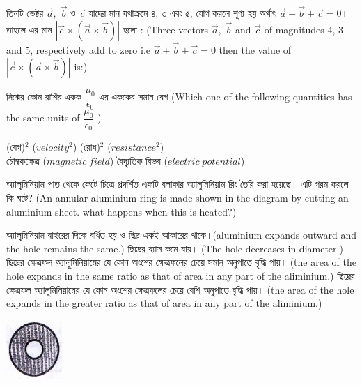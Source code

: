 \documentclass[addpoints]{exam}
\begin{document}
\begin{questions}
\question  তিনটি ভেক্টর $ \vec{a},\; \vec{b} $ ও $ \vec{c} $ যাদের মান যথাক্রমে ৪, ৩  এবং ৫, যোগ করলে শূণ্য হয় অর্থাৎ $ \vec{a}+\vec{b}+\vec{c} =0  $। তাহলে এর মান $ |\vec{c}\times (\vec{a}\times \vec{b})| $ হলো : (Three vectors $ \vec{a},\; \vec{b} $ and $ \vec{c} $ of magnitudes 4, 3 and 5, respectively add to zero i.e $ \vec{a}+\vec{b}+\vec{c} =0  $ then the value of $ |\vec{c}\times (\vec{a}\times \vec{b})| $ is:)

\begin{oneparchoices}
\end{oneparchoices}

\question  নিন্মের কোন রাশির একক $ \dfrac{\mu_{0}}{\epsilon_{0}} $ এর এককের সমান বেগ (Which one of the following quantities has the same units of $ \dfrac{\mu_{0}}{\epsilon_{0}} $ )

\begin{oneparchoices}
\choice (বেগ)$ ^{2} $ ($ velocity^{2} $)
\hspace*{1.4cm}\choice  (রোধ)$ ^{2} $ ($ resistance^{2} $)\\
\hspace*{-.32cm}\choice  চৌম্বকক্ষেত্র ($ magnetic\; field $)
\choice  বৈদ্যুতিক বিভব ($ electric\; potential $)
\end{oneparchoices}

\question   অ্যালুমিনিয়াম পাত থেকে কেটে চিত্রে প্রদর্শিত একটি বলাকার অ্যালুমিনিয়াম রিং তৈরি করা হয়েছে। এটি গরম করলে কি ঘটে? (An annular aluminium ring is made shown in the diagram by cutting an aluminium sheet. what happens when this is heated?)

\begin{minipage}{0.6\textwidth}\raggedright
\begin{oneparchoices}
\choice অ্যালুমিনিয়াম বাইরের দিকে বর্ধিত হয় ও ছিদ্র একই আকারের থাকে।(aluminium expands outward and the hole remains the same.)
\choice  ছিদ্রের ব্যাস কমে যায়। (The hole decreases in diameter.)
\choice  ছিদ্রের ক্ষেত্রফল অ্যালুমিনিয়ামের যে কোন অংশের ক্ষেত্রফলের চেয়ে সমান অনুপাতে বৃদ্ধি পায়। (the area of the hole expands in the same ratio as that of area in any part of the aliminium.)
\choice ছিদ্রের ক্ষেত্রফল অ্যালুমিনিয়ামের যে কোন অংশের ক্ষেত্রফলের চেয়ে বেশি অনুপাতে বৃদ্ধি পায়। (the area of the hole expands in the greater ratio as that of area in any part of the aliminium.)
\end{oneparchoices}
\end{minipage}
\hfill%
\begin{minipage}{0.3\textwidth}%
\includegraphics{du-al.png}
\end{minipage}%




\end{questions}
\end{document}
